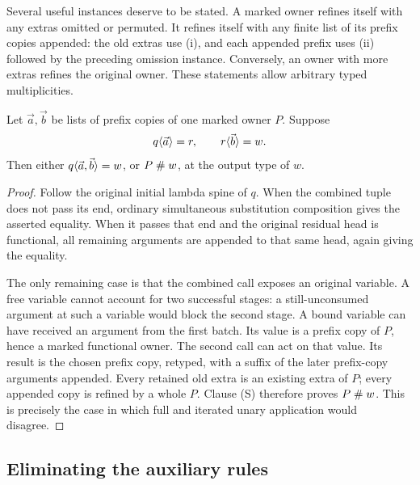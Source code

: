 Several useful instances deserve to be stated. A marked owner
refines itself with any extras omitted or permuted. It refines
itself with any finite list of its prefix copies appended:
the old extras use (i), and each appended prefix uses (ii)
followed by the preceding omission instance. Conversely, an
owner with more extras refines the original owner. These
statements allow arbitrary typed multiplicities.

\begin{lemma}\label{lem:prefix-escape}
Let $\vec a,\vec b$ be lists of prefix copies of one marked
owner $P$. Suppose
\[
 q\langle \vec a\rangle=r,\qquad r\langle \vec b\rangle=w.
\]
Then either $q\langle \vec a,\vec b\rangle=w$, or $P\mathrel{\#} w$,
at the output type of $w$.
\end{lemma}
\begin{proof}
Follow the original initial lambda spine of $q$. When the
combined tuple does not pass its end, ordinary simultaneous
substitution composition gives the asserted equality. When
it passes that end and the original residual head is
functional, all remaining arguments are appended to that
same head, again giving the equality.

The only remaining case is that the combined call exposes an
original variable. A free variable cannot account for two
successful stages: a still-unconsumed argument at such a
variable would block the second stage. A bound variable can
have received an argument from the first batch. Its value is
a prefix copy of $P$, hence a marked functional owner.
The second call can act on that value. Its result is the
chosen prefix copy, retyped, with a suffix of the later
prefix-copy arguments appended. Every retained old extra is
an existing extra of $P$; every appended copy is refined by a
whole $P$. Clause (S) therefore proves $P\mathrel{\#} w$.
This is precisely the case in which full and iterated unary
application would disagree.
\end{proof}

\subsection{Eliminating the auxiliary rules}

